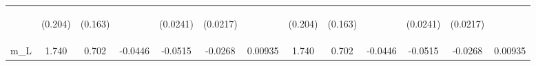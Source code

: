 \documentclass[]{article}
\begin{document}
\begin{center}
\begin{tabular}{lcccccccccccc}
\vspace{4pt} & \begin{footnotesize}(0.204)\end{footnotesize} & \begin{footnotesize}(0.163)\end{footnotesize} & \begin{footnotesize}\end{footnotesize} & \begin{footnotesize}(0.0241)\end{footnotesize} & \begin{footnotesize}(0.0217)\end{footnotesize} & \begin{footnotesize}\end{footnotesize} & \begin{footnotesize}(0.204)\end{footnotesize} & \begin{footnotesize}(0.163)\end{footnotesize} & \begin{footnotesize}\end{footnotesize} & \begin{footnotesize}(0.0241)\end{footnotesize} & \begin{footnotesize}(0.0217)\end{footnotesize} & \begin{footnotesize}\end{footnotesize} \\
m\_L & 1.740 & 0.702 & -0.0446 & -0.0515 & -0.0268 & 0.00935 & 1.740 & 0.702 & -0.0446 & -0.0515 & -0.0268 & 0.00935 \\

\end{tabular}
\end{center}
\end{document}
